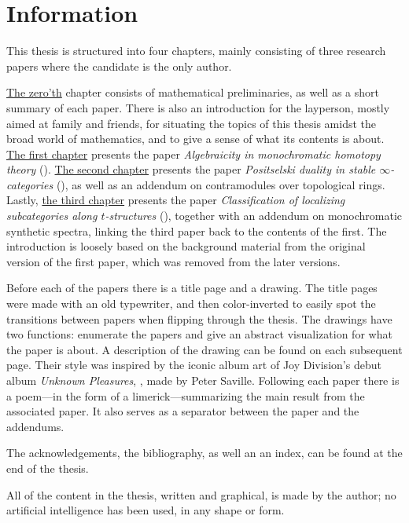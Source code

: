 
\section*{Information}

This thesis is structured into four chapters, mainly consisting of three research papers where the candidate is the only author.

\hyperref[ch0]{The zero'th} chapter consists of mathematical preliminaries, as well as a short summary of each paper. There is also an introduction for the layperson, mostly aimed at family and friends, for situating the topics of this thesis amidst the broad world of mathematics, and to give a sense of what its contents is about. \hyperref[ch1]{The first chapter} presents the paper \emph{Algebraicity in monochromatic homotopy theory} (\cite{aambo_2024_algebraicity}). \hyperref[ch2]{The second chapter} presents the paper \emph{Positselski duality in stable $\infty$-categories} (\cite{aambo_2024_positselski}), as well as an addendum on contramodules over topological rings. Lastly, \hyperref[ch3]{the third chapter} presents the paper \emph{Classification of localizing subcategories along $t$-structures} (\cite{aambo_2024_localizing}), together with an addendum on monochromatic synthetic spectra, linking the third paper back to the contents of the first. The introduction is loosely based on the background material from the original version of the first paper, which was removed from the later versions. 

Before each of the papers there is a title page and a drawing. The title pages were made with an old typewriter, and then color-inverted to easily spot the transitions between papers when flipping through the thesis. The drawings have two functions: enumerate the papers and give an abstract visualization for what the paper is about. A description of the drawing can be found on each subsequent page. Their style was inspired by the iconic album art of Joy Division's debut album \emph{Unknown Pleasures}, \cite{joy-division_79}, made by Peter Saville.  Following each paper there is a poem---in the form of a limerick---summarizing the main result from the associated paper. It also serves as a separator between the paper and the addendums. 

The acknowledgements, the bibliography, as well an an index, can be found at the end of the thesis. 

All of the content in the thesis, written and graphical, is made by the author; no artificial intelligence has been used, in any shape or form. 